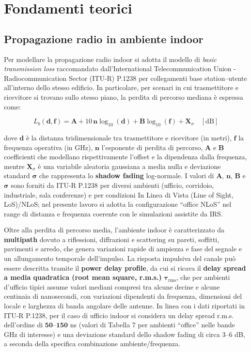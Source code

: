 \documentclass[12pt,a4paper]{report}
\begin{document}
\chapter{Fondamenti teorici}
\label{chap:fondamenti}

\section{Propagazione radio in ambiente indoor}
\label{sec:propagazione_indoor}
Per modellare la propagazione radio indoor si adotta il modello di
\emph{basic transmission loss} raccomandato dall'International
Telecommunication Union - Radiocommunication Sector (ITU-R) P.1238
\cite{itu_p1238_2025} per collegamenti base station--utente
all'interno dello stesso edificio. In particolare, per scenari in cui
trasmettitore e ricevitore si trovano sullo stesso piano, la perdita
di percorso mediana è espressa come:

\begin{equation}
  L_b(\mathbf{d},\mathbf{f}) = \mathbf{A} + 10\,\mathbf{n}
  \log_{10}(\mathbf{d}) + \mathbf{B} \log_{10}(\mathbf{f}) +
  \mathbf{X}_\sigma \quad [\text{dB}]
  \label{eq:itu_loss}
\end{equation}

dove $\mathbf{d}$ è la distanza tridimensionale tra trasmettitore e
ricevitore (in metri), $\mathbf{f}$ la frequenza operativa (in GHz),
$\mathbf{n}$ l'esponente di perdita di percorso, $\mathbf{A}$ e
$\mathbf{B}$ coefficienti che modellano rispettivamente l'offset e la
dipendenza dalla frequenza, mentre $\mathbf{X}_\sigma$ è una
variabile aleatoria gaussiana a media nulla e deviazione standard
$\boldsymbol{\sigma}$ che rappresenta lo \textbf{shadow fading}
log-normale. I valori di $\mathbf{A}$, $\mathbf{n}$, $\mathbf{B}$ e
$\boldsymbol{\sigma}$ sono forniti da ITU-R P.1238 per diversi
ambienti (ufficio, corridoio, industriale, sala conferenze) e per
condizioni In Linea di Vista (Line of Sight, LoS)/NLoS; nel presente
lavoro si adotta la configurazione ``office NLoS'' nel range di
distanza e frequenza coerente con le simulazioni assistite da IRS.

Oltre alla perdita di percorso media, l'ambiente indoor è
caratterizzato da \textbf{multipath} dovuto a riflessioni,
diffrazioni e scattering su pareti, soffitti, pavimenti e arredo, che
genera variazioni rapide di ampiezza e fase del segnale e un
allungamento temporale dell'impulso. La risposta impulsiva del canale
può essere descritta tramite il \textbf{power delay profile}, da cui
si ricava il \textbf{delay spread a media quadratica (root mean
square, r.m.s.)} $\boldsymbol{\tau}_{\mathrm{rms}}$, che per
ambienti d'ufficio tipici assume valori mediani compresi tra alcune
decine e alcune centinaia di nanosecondi, con variazioni dipendenti
da frequenza, dimensioni del locale e larghezza di banda angolare
delle antenne. In linea con i dati riportati in ITU-R P.1238, per il
caso di ufficio indoor si considera un delay spread r.m.s. dell'ordine di
$\mathbf{50}$--$\mathbf{150}$ ns (valori di Tabella 7 per ambienti
``office'' nelle bande GHz di interesse) e una deviazione standard
dello shadow fading di circa 3--6 dB, a seconda della specifica
combinazione ambiente/frequenza.
\end{document}

